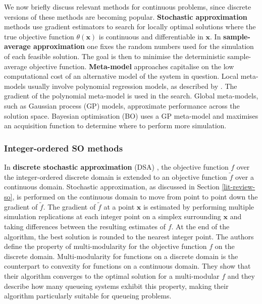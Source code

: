 \documentclass[12pt,a4paper]{article}
\begin{document}
We now briefly discuss relevant methods for continuous problems, since discrete versions of these methods are becoming popular. \textbf{Stochastic approximation} methods \citep{fu2006gradient} use gradient estimators to search for locally optimal solutions where the true objective function $\theta(\boldsymbol{x})$ is continuous and differentiable in $\boldsymbol{x}$. In \textbf{sample-average approximation} \citep{Kim2015} one fixes the random numbers used for the simulation of each feasible solution. The goal is then to minimise the deterministic sample-average objective function. \textbf{Meta-model} approaches capitalise on the low computational cost of an alternative model of the system in question. Local meta-models usually involve polynomial regression models, as described by \cite{barton2006metamodel}. The gradient of the polynomial meta-model is used in the search. Global meta-models, such as Gaussian process (GP) models, approximate performance across the solution space. Bayesian optimisation (BO) \citep{frazier2018bayesian} uses a GP meta-model and maximises an acquisition function to determine where to perform more simulation.

\subsubsection{Integer-ordered SO methods} \label{int-ordered-so}
%
In \textbf{discrete stochastic approximation} (DSA) \citep{lim2012stochastic}, the objective function $f$ over the integer-ordered discrete domain is extended to an objective function $\tilde{f}$ over a continuous domain. Stochastic approximation, as discussed in Section \ref{lit-review-so}, is performed on the continuous domain to move from point to point down the gradient of $\tilde{f}$. The gradient of $\tilde{f}$ at a point $\boldsymbol{x}$ is estimated by performing multiple simulation replications at each integer point on a simplex surrounding $\boldsymbol{x}$ and taking differences between the resulting estimates of $f$. At the end of the algorithm, the best solution is rounded to the nearest integer point. The authors define the property of multi-modularity for the objective function $f$ on the discrete domain. Multi-modularity for functions on a discrete domain is the counterpart to convexity for functions on a continuous domain. They show that their algorithm converges to the optimal solution for a multi-modular $f$ and they describe how many queueing systems exhibit this property, making their algorithm particularly suitable for queueing problems.
\end{document}
